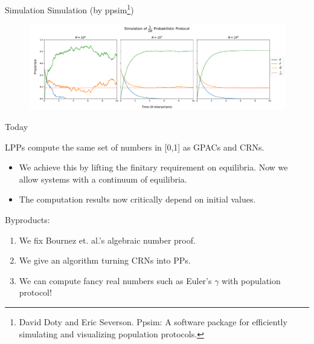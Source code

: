 \documentclass[aspectratio=169]{beamer}
\begin{document}
\begin{frame}[Clean]{Simulation}
    Simulation (by ppsim\footnote{David Doty and Eric Severson. Ppsim: A software package for efficiently
simulating and visualizing population protocols.})
\begin{figure}[tb]
    \centering
    \includegraphics[scale=0.3]{half_e}
\end{figure}
\end{frame}


\begin{frame}[Clean]{Today}
\begin{todaythm}
    LPPs compute the same set of numbers in [0,1] as GPACs
and CRNs.
\end{todaythm}
\pause
\begin{itemize}
    \item We achieve this by lifting the finitary requirement on equilibria. Now we allow systems with a continuum of equilibria.
    \item The computation results now critically depend  on initial values.
\end{itemize}\pause
Byproducts:
\begin{enumerate}
    \item We fix Bournez et. al.'s algebraic number proof.
    \item We give an algorithm turning CRNs into PPs.
    \item We can compute fancy real numbers such as Euler's $\gamma$ with population protocol!
\end{enumerate}
\end{frame}
\end{document}
